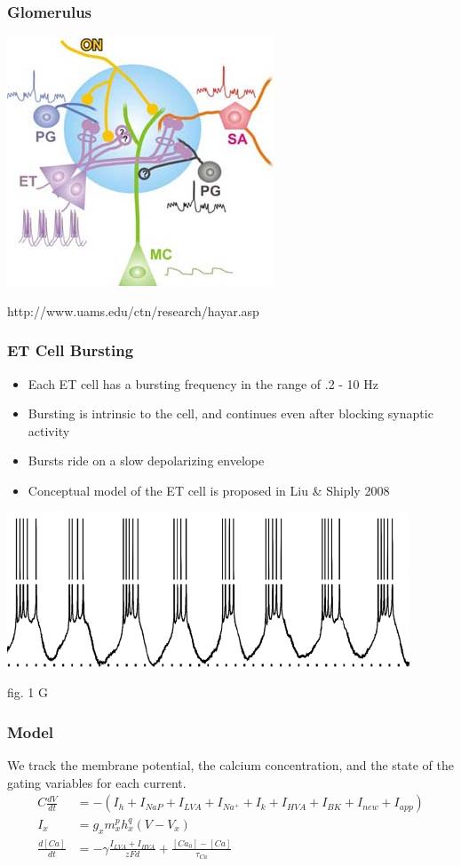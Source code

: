\documentclass{beamer}
\theoremstyle{plain}
\theoremstyle{definition}
\begin{document}
\begin{frame}\frametitle{Glomerulus}
  \begin{center}
   \includegraphics[scale = 2.6]{glomerulus.jpg}
  \end{center}
  http://www.uams.edu/ctn/research/hayar.asp
\end{frame}

\begin{frame}\frametitle{ET Cell Bursting}
 \begin{itemize}
  \item Each ET cell has a bursting frequency in the range of .2 - 10 Hz
  \item Bursting is intrinsic to the cell, and continues even after blocking synaptic activity
  \item Bursts ride on a slow depolarizing envelope
  \item Conceptual model of the ET cell is proposed in Liu \& Shiply 2008 \cite{liu_multiple_2008}
 \end{itemize}
 \begin{center}
  \includegraphics[scale = .4]{trace.png}
 \end{center}
 fig. 1 G
\end{frame}

 \begin{frame}\frametitle{Model}
 We track the membrane potential, the calcium concentration, and the state of the gating variables for each current.
 \begin{align*}
   C\frac{dV}{dt} &= -(I_h + I_{NaP} + I_{LVA} + I_{Na^+} + I_k + I_{HVA} + I_{BK} + I_{new} + I_{app})\\[1em]
   I_x &= g_xm_x^ph_x^q(V - V_x)\\[1em]
   \frac{d[Ca]}{dt} &= -\gamma\frac{I_{LVA} + I_{HVA}}{zFd} + \frac{[Ca_0] - [Ca]}{\tau_{Ca}}
 \end{align*}
 \end{frame}
\end{document}
